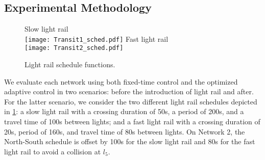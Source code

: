 %
% 
%


\subsection{Experimental Methodology}


\begin{figure}[t!]
\centering
\scriptsize{Slow light rail}\\
\texttt{[image: Transit1\_sched.pdf]}
\scriptsize{Fast light rail}\\
\texttt{[image: Transit2\_sched.pdf]}
\caption{Light rail schedule functions.}
\label{fig:transits}
\end{figure}



We evaluate each network using both fixed-time control and the optimized
adaptive control in two scenarios: before the introduction of light rail and
after.
%
For the latter scenario, we consider the two different light rail schedules
depicted in \cref{fig:transits}:
%
a slow light rail with a crossing duration of 50s, a period of 200s, and a
travel time of 100s between lights;
%
and a fast light rail with a crossing duration of 20s, period of 160s, and
travel time of 80s between lights.
%
On Network 2, the North-South schedule is offset by 100s for the slow light rail
and 80s for the fast light rail to avoid a collision at $l_5$.



